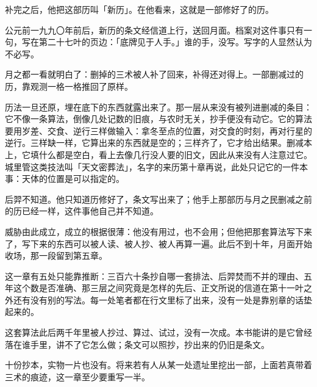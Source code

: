 补完之后，他把这部历叫「新历」。在他看来，这就是一部修好了的历。

公元前一九九〇年前后，新历的条文经信道上行，送回月面。档案对这件事只有一句，写在第二十七叶的页边：「底牌见于人手。」谁的手，没写。写字的人显然认为不必写。

月之都一看就明白了：删掉的三术被人补了回来，补得还对得上。一部删减过的历，靠观测一格一格推回了原样。

历法一旦还原，埋在底下的东西就露出来了。那一层从来没有被列进删减的条目：它不像一条算法，倒像几处记数的旧痕，与农时无关，抄手便没有动它。它的算法要用岁差、交食、逆行三样做输入：拿冬至点的位置，对交食的时刻，再对行星的逆行。三样缺一样，它算出来的东西就是空的；三样齐了，它才给出结果。删减本上，它填什么都是空白，看上去像几行没人要的旧文，因此从来没有人注意过它。城里管这类技法叫「天文密葬法」，名字的来历第十章再说，此处只记它的一件本事：天体的位置是可以指定的。

后羿不知道。他只知道历修好了，条文写出来了；他手上那部历与月之民删减之前的历已经一样，这件事他自己并不知道。

威胁由此成立，成立的根据很薄：他没有用过，也不会用；但他把那套算法写下来了，写下来的东西可以被人读、被人抄、被人再算一遍。此后不到十年，月面开始收场，那一段留到第五章。

这一章有五处只能靠推断：三百六十条抄自哪一套排法、后羿焚而不并的理由、五年这个数是否准确、那三层之间究竟是怎样的先后、正文所说的信道在第十一叶之外还有没有别的写法。每一处笔者都在行文里标了出来，没有一处是靠别章的话垫起来的。

这套算法此后两千年里被人抄过、算过、试过，没有一次成。本书能讲的是它曾经落在谁手里，讲不了它怎么做；条文可以照抄，抄出来的仍旧是条文。

十份抄本，实物一片也没有。将来若有人从某一处遗址里挖出一部，上面若真带着三术的痕迹，这一章至少要重写一半。
